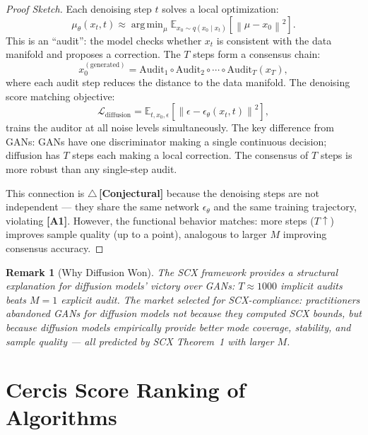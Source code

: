 \documentclass[12pt,a4paper]{article}
\newtheorem{remark}[theorem]{Remark}
\theoremstyle{definition}
\newcommand{\rigorConjectural}{{\color{red!70!black}$\triangle$\,\textbf{[Conjectural]}}}
\newcommand{\SCX}{\textsc{SCX}}
\DeclareMathOperator*{\argmin}{arg\,min}
\newcommand{\E}{\mathbb{E}}
\newcommand{\norm}[1]{\left\lVert#1\right\rVert}
\newcommand{\asmTag}[1]{\textsf{\textbf{[A#1]}}}
\begin{document}
\begin{proof}[Proof Sketch]
Each denoising step $t$ solves a local optimization:
\begin{equation}
    \mu_\theta(x_t, t) \approx \argmin_{\mu} \E_{x_0 \sim q(x_0 \mid x_t)}\left[\norm{\mu - x_0}^2\right].
\end{equation}
This is an ``audit'': the model checks whether $x_t$ is consistent with the data manifold and proposes a correction. The $T$ steps form a consensus chain:
\begin{equation}
    x_0^{(\text{generated})} = \text{Audit}_1 \circ \text{Audit}_2 \circ \cdots \circ \text{Audit}_T (x_T),
\end{equation}
where each audit step reduces the distance to the data manifold. The denoising score matching objective:
\begin{equation}
    \mathcal{L}_{\text{diffusion}} = \E_{t, x_0, \epsilon}\left[\norm{\epsilon - \epsilon_\theta(x_t, t)}^2\right],
\end{equation}
trains the auditor at all noise levels simultaneously. The key difference from GANs: GANs have one discriminator making a single continuous decision; diffusion has $T$ steps each making a local correction. The consensus of $T$ steps is more robust than any single-step audit.

This connection is \rigorConjectural{} because the denoising steps are not independent — they share the same network $\epsilon_\theta$ and the same training trajectory, violating \asmTag{1}. However, the functional behavior matches: more steps ($T \uparrow$) improves sample quality (up to a point), analogous to larger $M$ improving consensus accuracy.
\end{proof}

\begin{remark}[Why Diffusion Won]
The \SCX{} framework provides a structural explanation for diffusion models' victory over GANs: $T \approx 1000$ implicit audits beats $M=1$ explicit audit. The market selected for \SCX{}-compliance: practitioners abandoned GANs for diffusion models not because they computed \SCX{} bounds, but because diffusion models empirically provide better mode coverage, stability, and sample quality — all predicted by \SCX{} Theorem~1 with larger $M$.
\end{remark}

\section{Cercis Score Ranking of Algorithms}
\end{document}
